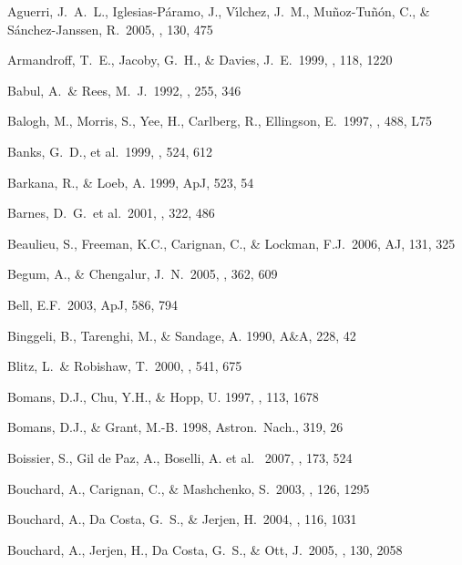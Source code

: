 \documentclass[12pt,preprint]{emulateapj}
\begin{document}
\begin{thebibliography}{}

Aguerri, J.~A.~L., Iglesias-P{\'a}ramo, J., V{\'{\i}}lchez, J.~M., 
Mu{\~n}oz-Tu{\~n}{\'o}n, C., \& S{\'a}nchez-Janssen, R.\ 2005, \aj, 130, 475 

Armandroff, T.~E., Jacoby, G.~H., \& Davies, J.~E.\ 1999, \aj, 118, 1220

Babul, A.~\& Rees, M.~J.\ 1992, \mnras, 255, 346 

Balogh, M., Morris, S., Yee, H., Carlberg, R., Ellingson, E.\ 1997, \apj, 488, L75 

Banks, G.~D., et al.\ 1999, \apj, 524, 612 

Barkana, R., \& Loeb, A. 1999, ApJ, 523, 54

Barnes, D.~G.~et al.\ 2001, \mnras, 322, 486 

Beaulieu, S., Freeman, K.C., Carignan, C., \&  Lockman, F.J.\ 2006, AJ, 131, 325 

Begum, A., \& Chengalur, J.~N.\ 2005, \mnras, 362, 609 

Bell, E.F.\ 2003, ApJ, 586, 794

Binggeli, B., Tarenghi, M., \& Sandage, A. 1990, A\&A, 228, 42

Blitz, L.~\& Robishaw, T.\ 2000, \apj, 541, 675 

Bomans, D.J., Chu, Y.H., \& Hopp, U. 1997, \aj , 113, 1678

Bomans, D.J., \& Grant, M.-B. 1998, Astron.\ Nach., 319, 26

Boissier, S., Gil de Paz, A., Boselli, A. et al. \ 2007, \apj, 173, 524 

Bouchard, A., Carignan, C., \& Mashchenko, S.\ 2003, \aj, 126, 1295 

Bouchard, A., Da Costa, G.~S., \& Jerjen, H.\ 2004, \pasp, 116, 1031 

Bouchard, A., Jerjen, H., Da Costa, G.~S., \& Ott, J.\ 2005, \aj, 130, 2058 


\end{thebibliography}
\end{document}
